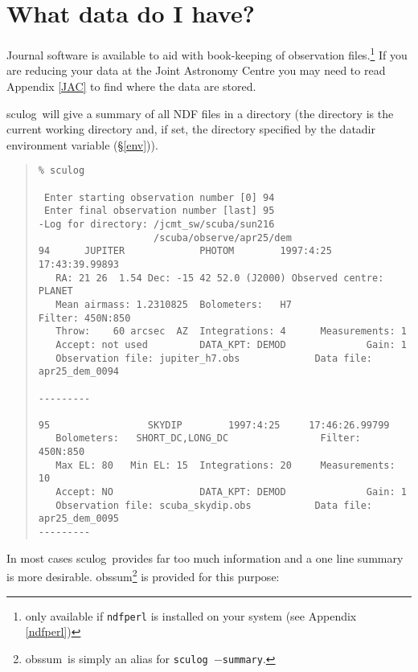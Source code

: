 \documentclass[twoside,11pt]{article}
\newcommand{\task}[1]{{\sf #1}}
\newcommand{\sculog}{\htmlref{\task{sculog}}{SCULOG}}
\newcommand{\obssum}{\htmlref{\task{obssum}}{OBSSUM}}
\newenvironment{myquote}{\begin{quote}\begin{small}}{\end{small}\end{quote}}
\newcommand{\htmlref}[2]{#1}
\newcommand{\xlabel}[1]{}
\begin{document}
\section{\xlabel{journal}What data do I have?\label{journal}}

Journal software is available to aid with book-keeping of observation
files.\footnote{only available if {\tt ndfperl} is installed on your system
(see Appendix \ref{ndfperl})}  If you are reducing your data at the Joint
Astronomy Centre you may need to read Appendix \ref{JAC} to find where the
data are stored.

\sculog\ will give a summary of all NDF files in
a directory (the directory is the current working directory and, if set, the
directory specified by the {\sc datadir} environment variable (\S\ref{env})).
\begin{myquote}
\begin{verbatim}
% sculog
 
 Enter starting observation number [0] 94
 Enter final observation number [last] 95
-Log for directory: /jcmt_sw/scuba/sun216
                    /scuba/observe/apr25/dem
94      JUPITER             PHOTOM        1997:4:25     17:43:39.99893
   RA: 21 26  1.54 Dec: -15 42 52.0 (J2000) Observed centre: PLANET
   Mean airmass: 1.2310825  Bolometers:   H7                Filter: 450N:850
   Throw:    60 arcsec  AZ  Integrations: 4      Measurements: 1
   Accept: not used         DATA_KPT: DEMOD              Gain: 1
   Observation file: jupiter_h7.obs             Data file: apr25_dem_0094
 
---------
 
95                 SKYDIP        1997:4:25     17:46:26.99799
   Bolometers:   SHORT_DC,LONG_DC                Filter: 450N:850
   Max EL: 80   Min EL: 15  Integrations: 20     Measurements: 10
   Accept: NO               DATA_KPT: DEMOD              Gain: 1
   Observation file: scuba_skydip.obs           Data file: apr25_dem_0095
---------
\end{verbatim}
\end{myquote}
In most cases \sculog\ provides far too much information and a one 
line summary is more desirable. \obssum\footnote{\obssum\ is simply an alias
for \texttt{\sculog\ $-$summary}.} is provided for this purpose:
\end{document}
